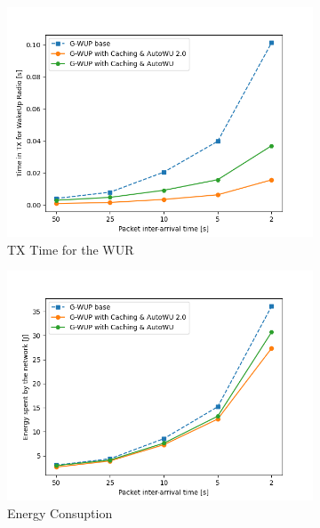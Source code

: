 \begin{figure}[H]
  \begin{subfigure}[t]{0.49\linewidth}
    \includegraphics[width=1.1\linewidth]{Contents/Images/graphs/final2.0/tx_time.png}
    \caption{TX Time for the WUR}
    \label{fig:TXTime_final2.0}
  \end{subfigure}
  \begin{subfigure}[t]{0.49\linewidth}
    \includegraphics[width=1.1\linewidth]{Contents/Images/graphs/final2.0/energySpent.png}
    \caption{Energy Consuption}
    \label{fig:EnergySpent_final2.0}
  \end{subfigure}
  \begin{subfigure}[t]{0.49\linewidth}

\end{subfigure}
\end{figure}
